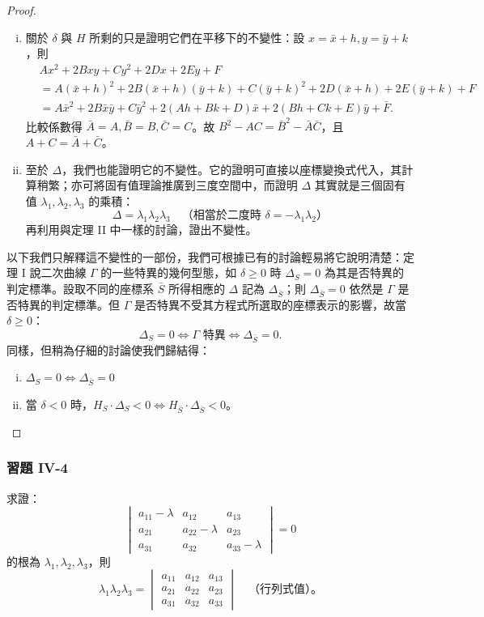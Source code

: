 \begin{proof}
\begin{enumerate}[(i)]
  \item 關於 $\delta$ 與 $H$ 所剩的只是證明它們在平移下的不變性：設 $x = \bar{x} + h, y = \bar{y} + k$，則
  \[
  \begin{aligned}
  &Ax^2 + 2Bxy + Cy^2 + 2Dx + 2Ey + F \\
  &= A(\bar{x} + h)^2 + 2B(\bar{x} + h)(\bar{y} + k) + C(\bar{y} + k)^2 + 2D(\bar{x} + h) + 2E(\bar{y} + k) + F \\
  &= A\bar{x}^2 + 2B\bar{x}\bar{y} + C\bar{y}^2 + 2(Ah + Bk + D)\bar{x} + 2(Bh + Ck + E)\bar{y} + \bar{F}.
  \end{aligned}
  \]
  比較係數得 $\bar{A} = A, \bar{B} = B, \bar{C} = C$。故 $B^2 - AC = \bar{B}^2 - \bar{A}\bar{C}$，且 $A + C = \bar{A} + \bar{C}$。

  \item 至於 $\Delta$，我們也能證明它的不變性。它的證明可直接以座標變換式代入，其計算稍繁；亦可將固有值理論推廣到三度空間中，而證明 $\Delta$ 其實就是三個固有值 $\lambda_1, \lambda_2, \lambda_3$ 的乘積：
  \[
  \Delta = \lambda_1 \lambda_2 \lambda_3 \quad \text{（相當於二度時 $\delta = -\lambda_1 \lambda_2$）}
  \]
  再利用與定理 II 中一樣的討論，證出不變性。
\end{enumerate}

以下我們只解釋這不變性的一部份，我們可根據已有的討論輕易將它說明清楚：定理 I 說二次曲線 $\Gamma$ 的一些特異的幾何型態，如 $\delta \ge 0$ 時 $\Delta_S = 0$ 為其是否特異的判定標準。設取不同的座標系 $\bar{S}$ 所得相應的 $\Delta$ 記為 $\Delta_{\bar{S}}$；則 $\Delta_{\bar{S}} = 0$ 依然是 $\Gamma$ 是否特異的判定標準。但 $\Gamma$ 是否特異不受其方程式所選取的座標表示的影響，故當 $\delta \ge 0$：
\[
\Delta_S = 0 \iff \Gamma \text{ 特異} \iff \Delta_{\bar{S}} = 0.
\]
同樣，但稍為仔細的討論使我們歸結得：
\begin{enumerate}[(i)]
  \item $\Delta_S = 0 \iff \Delta_{\bar{S}} = 0$
  \item 當 $\delta < 0$ 時，$H_S \cdot \Delta_S < 0 \iff H_{\bar{S}} \cdot \Delta_{\bar{S}} < 0$。
\end{enumerate}
\end{proof}

\subsubsection*{習題 IV-4}

求證：
\[
\begin{vmatrix}
a_{11} - \lambda & a_{12} & a_{13} \\
a_{21} & a_{22} - \lambda & a_{23} \\
a_{31} & a_{32} & a_{33} - \lambda
\end{vmatrix} = 0
\]
的根為 $\lambda_1, \lambda_2, \lambda_3$，則
\[
\lambda_1 \lambda_2 \lambda_3 = \begin{vmatrix}
a_{11} & a_{12} & a_{13} \\
a_{21} & a_{22} & a_{23} \\
a_{31} & a_{32} & a_{33}
\end{vmatrix} \quad \text{（行列式值）。}
\]


